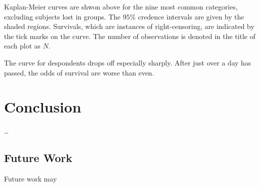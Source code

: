 \documentclass[12pt,titlepage]{article}
\begin{document}
    

    Kaplan-Meier curves are shwon above for the nine most common categories,
    excluding subjects lost in groups. The $95\%$ credence intervals are
    given by the shaded regions. Survivals, which are instances of
    right-censoring, are indicated by the tick marks on the curve. The number
    of observations is denoted in the title of each plot as $N$.

    The curve for despondents drops off especially sharply. After just over
    a day has passed, the odds of survival are worse than even.


    

    
    

  \section{Conclusion}
    \ldots




    \subsection{Future Work}
      Future work may

  
  
\end{document}
